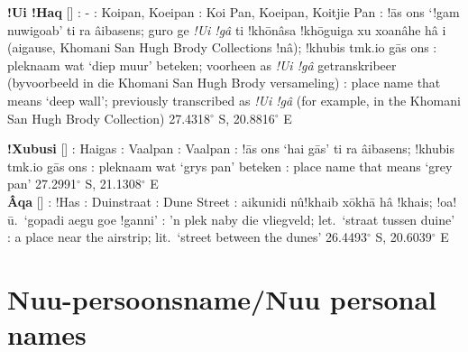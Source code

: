 \textbf{!Ui !Haq} [] : - : Koipan,
Koeipan : Koi Pan, Koeipan, Koitjie Pan :
!\={a}s \textvertline{}ons `!gam
\textdoublebarpipe{}nuwi\textdoublebarpipe{}goab' ti ra
\textdoublebarpipe{}\^{a}ibasens; \textdoublebarpipe{}guro ge
\emph{!Ui !g\^{a}} ti !kh\={o}\textdoublevertline{}n\^{a}sa
!kh\={o}\textdoublevertline{}guiga xu xoa\textdoublevertline{}n\^{a}he
h\^{a} i (ai\textdoublevertline{}gause, \textdoublebarpipe{}Khomani
San Hugh Brody Collections !n\^{a}); !khubis tmk.io
\textdoublebarpipe{}g\={a}s \textvertline{}ons :
pleknaam wat `diep muur' beteken; voorheen as \emph{!Ui !g\^{a}}
getranskribeer (byvoorbeeld in die \textdoublebarpipe{}Khomani San
Hugh Brody versameling) : place name that means `deep
wall'; previously transcribed as \emph{!Ui !g\^{a}} (for example, in
the \textdoublebarpipe{}Khomani San Hugh Brody Collection)
27.4318$^{\circ}$ S, 20.8816$^{\circ}$ E \\

\newpage

\textbf{!Xubusi} [] :
\textvertline{}Hai\textdoublebarpipe{}gas : Vaalpan
: Vaalpan : !\={a}s \textvertline{}ons
`\textvertline{}hai \textdoublebarpipe{}g\={a}s' ti ra
\textdoublebarpipe{}\^{a}ibasens; !khubis tmk.io
\textdoublebarpipe{}g\={a}s \textvertline{}ons :
pleknaam wat `grys pan' beteken : place name that means
`grey pan' 27.2991$^{\circ}$ S, 21.1308$^{\circ}$ E \\

\textbf{\textdoublebarpipe{}\^{A}qa}
[] : !Has
: Duinstraat : Dune Street
: aikunidi \textdoublebarpipe{}n\^{u}!khaib
x\={o}\textvertline{}kh\={a} h\^{a} !khais; !oa!\={u}.\
`\textvertline{}gopadi \textdoublevertline{}aegu
\textdoublevertline{}goe !ganni' : 'n plek naby die
vliegveld; let.\ `straat tussen duine' \underbar{Eng}: a place near
the airstrip; lit.\ `street between the dunes' 26.4493$^{\circ}$ S,
20.6039$^{\circ}$ E


\markboth{}{}
\section{N\textipa{\textvertline}uu-persoonsname/N\textvertline{}uu
personal names}
\markboth{}{}

